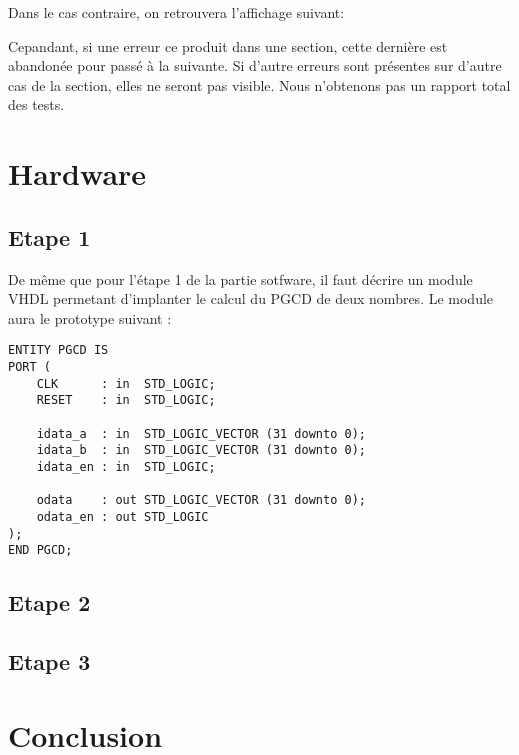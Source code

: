 \documentclass[a4paper]{article}
\begin{document}

        Dans le cas contraire, on retrouvera l'affichage suivant:

        Cepandant, si une erreur ce produit dans une section, cette dernière est abandonée pour passé à la suivante.
        Si d'autre erreurs sont présentes sur d'autre cas de la section, elles ne seront pas visible. Nous n'obtenons pas un rapport total des tests.

\newpage
\section{Hardware}
    \subsection{Etape 1}
        De même que pour l'étape 1 de la partie sotfware, il faut décrire un module VHDL permetant d'implanter le calcul du PGCD de deux nombres.
        Le module aura le prototype suivant :

\begin{lstlisting}[style=VHDL]
ENTITY PGCD IS
PORT ( 
    CLK      : in  STD_LOGIC;
    RESET    : in  STD_LOGIC;

    idata_a  : in  STD_LOGIC_VECTOR (31 downto 0);
    idata_b  : in  STD_LOGIC_VECTOR (31 downto 0);
    idata_en : in  STD_LOGIC;

    odata    : out STD_LOGIC_VECTOR (31 downto 0);
    odata_en : out STD_LOGIC
);
END PGCD;  
\end{lstlisting}
    \subsection{Etape 2}
    \subsection{Etape 3}

\section{Conclusion} %
\begin{lstlisting}[style=CStyle]
    
\end{lstlisting}

\newpage %
\listoftodos
\end{document}
